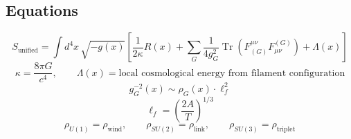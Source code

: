 \documentclass[11pt]{article}
\begin{document}
\subsection*{Equations}
\begin{equation*}
 S_{\text{unified}}=\int d^4x\,\sqrt{-g(x)}\left[
 \frac{1}{2\kappa}R(x)
 +\sum_G\frac{1}{4g_G^2}\operatorname{Tr}\left(F^{\mu\nu}_{(G)}F_{\mu\nu}^{(G)}\right)
 +\Lambda(x)\right]
\end{equation*}
\begin{equation*}
 \kappa=\frac{8\pi G}{c^4},\qquad
 \Lambda(x)=\text{local cosmological energy from filament configuration}
\end{equation*}
\begin{equation*}
 g_G^{-2}(x)\sim\rho_G(x)\cdot\ell_f^2
\end{equation*}
\begin{equation*}
 \ell_f=\left(\frac{2A}{T}\right)^{1/3}
\end{equation*}
\begin{equation*}
 \rho_{U(1)}=\rho_{\mathrm{wind}},\qquad
 \rho_{SU(2)}=\rho_{\mathrm{link}},\qquad
 \rho_{SU(3)}=\rho_{\mathrm{triplet}}
\end{equation*}
\end{document}

